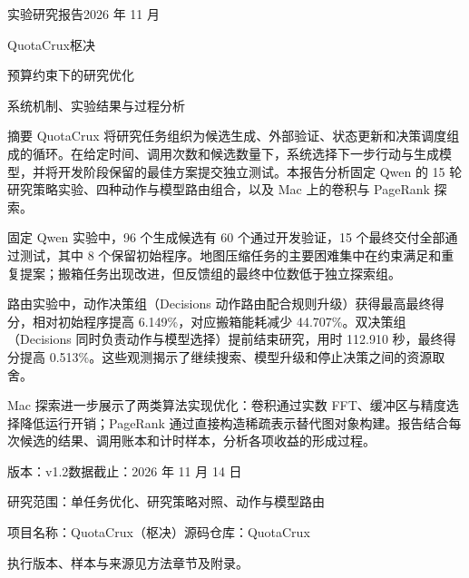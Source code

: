 \documentclass[11pt,a4paper,UTF8,fontset=none]{ctexart}
\begin{document}
\thispagestyle{empty}
{\noindent\sffamily\small\color{teal}实验研究报告\hfill 2026 年 11 月}
\vspace{15mm}

{\noindent\sffamily\fontsize{36}{44}\selectfont\color{ink}QuotaCrux\quad 枢决}\par
\vspace{5mm}
{\noindent\sffamily\fontsize{24}{33}\selectfont\color{ink}预算约束下的研究优化}\par
\vspace{3mm}
{\noindent\sffamily\large\color{muted}系统机制、实验结果与过程分析}
\vspace{10mm}

\begin{finding}{摘要}
QuotaCrux 将研究任务组织为候选生成、外部验证、状态更新和决策调度组成的循环。在给定时间、调用次数和候选数量下，系统选择下一步行动与生成模型，并将开发阶段保留的最佳方案提交独立测试。本报告分析固定 Qwen 的 15 轮研究策略实验、四种动作与模型路由组合，以及 Mac 上的卷积与 PageRank 探索。

固定 Qwen 实验中，96 个生成候选有 60 个通过开发验证，15 个最终交付全部通过测试，其中 8 个保留初始程序。地图压缩任务的主要困难集中在约束满足和重复提案；搬箱任务出现改进，但反馈组的最终中位数低于独立探索组。

路由实验中，动作决策组（Decisions 动作路由配合规则升级）获得最高最终得分，相对初始程序提高 6.149\%，对应搬箱能耗减少 44.707\%。双决策组（Decisions 同时负责动作与模型选择）提前结束研究，用时 112.910 秒，最终得分提高 0.513\%。这些观测揭示了继续搜索、模型升级和停止决策之间的资源取舍。

Mac 探索进一步展示了两类算法实现优化：卷积通过实数 FFT、缓冲区与精度选择降低运行开销；PageRank 通过直接构造稀疏表示替代图对象构建。报告结合每次候选的结果、调用账本和计时样本，分析各项收益的形成过程。
\end{finding}
\vfill
{\noindent\small\color{muted}
版本：v1.2\quad 数据截止：2026 年 11 月 14 日\par
研究范围：单任务优化、研究策略对照、动作与模型路由\par
项目名称：QuotaCrux（枢决）\quad 源码仓库：QuotaCrux\par
执行版本、样本与来源见方法章节及附录。
}

\clearpage
\tableofcontents
\vspace{8mm}
\end{document}
